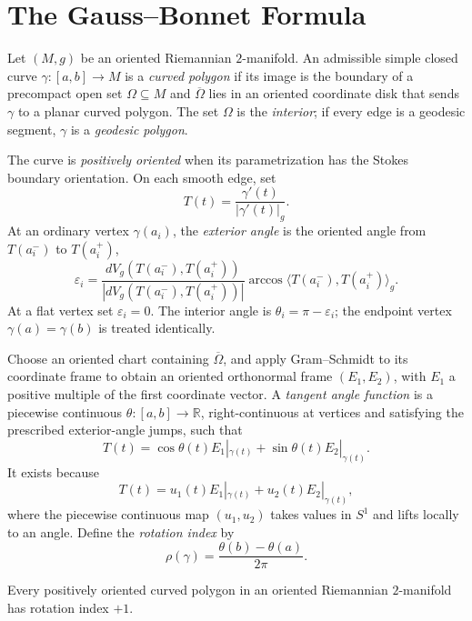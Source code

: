 \section{The Gauss--Bonnet Formula}

Let $(M,g)$ be an oriented Riemannian $2$-manifold.  An admissible simple
closed curve $\gamma:[a,b]\to M$ is a \emph{curved polygon} if its image is
the boundary of a precompact open set $\Omega\subseteq M$ and
$\overline\Omega$ lies in an oriented coordinate disk that sends $\gamma$ to
a planar curved polygon.  The set $\Omega$ is the \emph{interior}; if every
edge is a geodesic segment, $\gamma$ is a \emph{geodesic polygon}.

The curve is \emph{positively oriented} when its parametrization has the
Stokes boundary orientation.  On each smooth edge, set
\[
T(t)=\frac{\gamma'(t)}{|\gamma'(t)|_g}.
\]
At an ordinary vertex $\gamma(a_i)$, the \emph{exterior angle} is the oriented
angle from $T(a_i^-)$ to $T(a_i^+)$,
\begin{equation}
\varepsilon_i=
\frac{dV_g(T(a_i^-),T(a_i^+))}
{|dV_g(T(a_i^-),T(a_i^+))|}
\arccos\langle T(a_i^-),T(a_i^+)\rangle_g. \tag{9.4}
\end{equation}
At a flat vertex set $\varepsilon_i=0$.  The interior angle is
$\theta_i=\pi-\varepsilon_i$; the endpoint vertex $\gamma(a)=\gamma(b)$ is
treated identically.

Choose an oriented chart containing $\overline\Omega$, and apply
Gram--Schmidt to its coordinate frame to obtain an oriented orthonormal frame
$(E_1,E_2)$, with $E_1$ a positive multiple of the first coordinate vector.
A \emph{tangent angle function} is a piecewise continuous
$\theta:[a,b]\to\mathbb R$, right-continuous at vertices and satisfying the
prescribed exterior-angle jumps, such that
\[
T(t)=\cos\theta(t)E_1|_{\gamma(t)}
+\sin\theta(t)E_2|_{\gamma(t)}.
\]
It exists because
\begin{equation}
T(t)=u_1(t)E_1|_{\gamma(t)}+u_2(t)E_2|_{\gamma(t)}, \tag{9.5}
\end{equation}
where the piecewise continuous map $(u_1,u_2)$ takes values in $S^1$ and
lifts locally to an angle.  Define the \emph{rotation index} by
\[
\rho(\gamma)=\frac{\theta(b)-\theta(a)}{2\pi}.
\]

\begin{lemma}
\label{lem:rotation-index-plus-one}

Every positively oriented curved polygon in an oriented Riemannian
$2$-manifold has rotation index $+1$.
\end{lemma}

